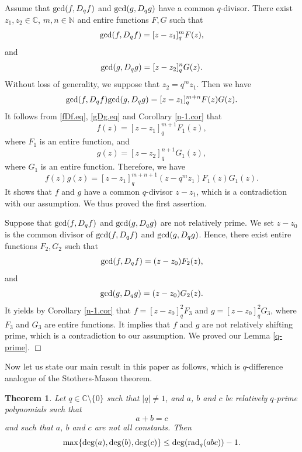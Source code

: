 \documentclass[a4paper,12pt]{article}
\newcommand{\C}{\mathbb{C}}
\newcommand{\N}{\mathbb{N}}
\newtheorem{theorem}[defin]{Theorem}
\newenvironment{proof}
{\noindent{\it Proof.}}{\hfill $\Box$\par\vspace{2.5mm}}
\numberwithin{equation}{section}
\begin{document}
\begin{proof}
Assume that ${\rm gcd}(f,D_q f)$ and ${\rm gcd}(g,D_q g)$ have a common $q$-divisor.
There exist $z_1,z_2\in\C$, $m,n\in\N$ and entire functions $F,G$ such that
    \begin{equation}\label{fDf.eq}
    {\rm gcd}(f,D_q f)=[z-z_1]_q^mF(z),
    \end{equation}
and
    \begin{equation}\label{gDg.eq}
    {\rm gcd}(g,D_q g)=[z-z_2]_q^nG(z).
    \end{equation}
Without loss of generality, we suppose that $z_2=q^mz_1$. Then we have
    $$
    {\rm gcd}(f,D_q f){\rm gcd}(g,D_q g)=[z-z_1]^{m+n}_qF(z)G(z).
    $$
It follows from \eqref{fDf.eq}, \eqref{gDg.eq} and Corollary \ref{n-1.cor} that
    $$
    f(z)=[z-z_1]^{m+1}_qF_1(z),
    $$
where $F_1$ is an entire function, and
    $$
    g(z)=[z-z_2]^{n+1}_qG_1(z),
    $$
where $G_1$ is an entire function. Therefore, we have
    $$
    f(z)g(z)=[z-z_1]^{m+n+1}_q(z-q^mz_1)F_1(z)G_1(z).
    $$
It shows that $f$ and $g$ have a common $q$-divisor $z-z_1$, which is a contradiction
with our assumption. We thus proved the first assertion.

Suppose that ${\rm gcd}(f,D_q f)$ and ${\rm gcd}(g,D_q g)$ are not relatively prime.
We set $z-z_0$ is the common divisor of ${\rm gcd}(f,D_q f)$ and ${\rm gcd}(g,D_q g)$. Hence,
there exist entire functions $F_2, G_2$ such that
    $$
    {\rm gcd}(f,D_q f)=(z-z_0)F_2(z),
    $$
and
    $$
    {\rm gcd}(g,D_q g)=(z-z_0)G_2(z).
    $$
It yields by Corollary \ref{n-1.cor} that $f=[z-z_0]^2_qF_3$ and $g=[z-z_0]_q^2G_3$, where $F_3$ and $G_3$ are entire functions. It implies that $f$ and $g$ are not relatively shifting prime, which
is a contradiction to our assumption. We proved our Lemma \ref{q-prime}.
\end{proof}

Now let us state our main result in this paper as follows, which is $q$-difference analogue of the Stothers-Mason theorem.

\begin{theorem}\label{qabc.theorem}
Let $q\in\C\setminus\{0\}$ such that $|q|\neq 1$, and $a$, $b$ and $c$ be relatively $q$-prime polynomials such that
    $$
    a+b=c
    $$
and such that $a$, $b$ and $c$ are not all constants. Then
    \begin{equation}\label{diff-abc.eq}
    \max\{\deg(a),\deg(b),\deg(c)\}\leq \deg({{\rm rad}_q(abc)})-1.
    \end{equation}
\end{theorem}
\end{document}
